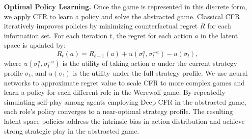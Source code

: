 \textbf{Optimal Policy Learning.} 
Once the game is represented in this discrete form, we apply CFR to learn a policy and solve the abstracted game. Classical CFR~\cite{zinkevich2007regret} iteratively improves policies by minimizing counterfactual regret $R$ for each information set.
For each iteration $t$, the regret for each action $a$ in the latent space is updated by:
\begin{equation}
R_t(a) = R_{t-1}(a) + u(\sigma_t^a, \sigma_t^{-a}) - u(\sigma_t),
\end{equation}
where $u(\sigma_t^a, \sigma_t^{-a})$ is the utility of taking action $a$ under the current strategy profile $\sigma_t$, and $u(\sigma_t)$ is the utility under the full strategy profile.
We use neural networks to approximate regret value to scale CFR to more complex games and learn a policy for each different role in the Werewolf game. By repeatedly simulating self-play among agents employing Deep CFR in the abstracted game, each role’s policy converges to a near-optimal strategy profile. The resulting latent space policies address the intrinsic bias in action distribution and achieve strong strategic play in the abstracted game.







